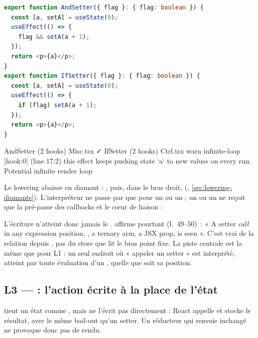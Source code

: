 \begin{lstlisting}[language=TypeScript,caption={\file{/tmp/r27/misc/Misc.tsx} et son témoin \file{/tmp/r27/ctrl/Ctrl.tsx} (extraits)}]
export function AndSetter({ flag }: { flag: boolean }) {
  const [a, setA] = useState(0);
  useEffect(() => {
    flag && setA(a + 1);
  });
  return <p>{a}</p>;
}
export function IfSetter({ flag }: { flag: boolean }) {
  const [a, setA] = useState(0);
  useEffect(() => {
    if (flag) setA(a + 1);
  });
  return <p>{a}</p>;
}
\end{lstlisting}

\begin{sortie}
  AndSetter  (2 hooks)  Misc.tsx  ✓
  IfSetter  (2 hooks)  Ctrl.tsx
    warn   infinite-loop  [hook:0]  (line 17:2)  this effect keeps pushing state `a` to new values on every run. Potential infinite render loop
\end{sortie}

Le lowering abaisse  en diamant : , puis, dans le bras droit,  (, \cref{sec:lowering-diamants}). L'interpréteur ne passe par  que pour un  ou un  ; un  ou un  ne reçoit que la pré-passe des callbacks et le cœur de liaison :


L'écriture n'atteint donc jamais le .  affirme pourtant (l.~49--50)~: « A setter \emph{call} in any expression position, , a ternary arm, a JSX prop, is seen ». C'est vrai de la relation  depuis , pas du store que lit le bras point fixe. La piste centrale est la même que pour L1 : un seul endroit où « appeler un setter » est interprété, atteint par toute évaluation d'un , quelle que soit sa position.

\subsection{L3 --- \texorpdfstring{}{useReducer} : l'action écrite à la place de l'état}

\begin{react}
 tient un état comme , mais  ne l'écrit pas directement : React appelle  et stocke le résultat, avec le même bail-out  qu'un setter. Un réducteur qui renvoie  inchangé ne provoque donc pas de rendu.
\end{react}

